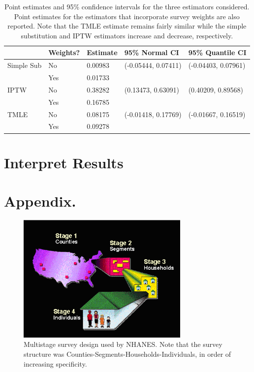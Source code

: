 \documentclass{article}
\begin{document}
\begin{table}
\begin{tabular}{| l| l | l | l | l |}
  \hline
 & Weights? & Estimate & 95\% Normal CI & 95\% Quantile CI \\ 
  \hline
Simple Sub & No & 0.00983 & (-0.05444, 0.07411) & (-0.04403, 0.07961) \\ 
& Yes & 0.01733 & & \\
\hline
  IPTW & No & 0.38282 & (0.13473, 0.63091) & (0.40209, 0.89568) \\ 
& Yes & 0.16785 & & \\
\hline
  TMLE & No & 0.08175 & (-0.01418, 0.17769) & (-0.01667, 0.16519) \\ 
& Yes & 0.09278 & & \\
   \hline
\end{tabular}
\caption{Point estimates and 95\% confidence intervals for the three estimators considered. Point estimates for the estimators that incorporate survey weights are also reported. Note that the TMLE estimate remains fairly similar while the simple substitution and IPTW estimators increase and decrease, respectively.}
\label{tab:ests}
\end{table}

\section{Interpret Results}



{}



\section*{Appendix.}
\begin{figure}
\centering
\includegraphics[width=0.75\textwidth]{figures/Survey_Design.PNG}
\caption{Multistage survey design used by NHANES. Note that the survey structure was Counties-Segments-Households-Individuals, in order of increasing specificity.}
\label{fig:survey.design}
\end{figure}
\end{document}
